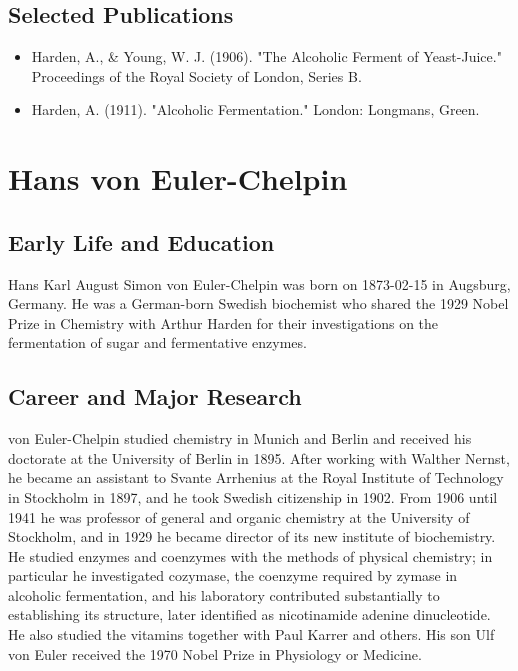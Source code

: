 \subsection*{Selected Publications}

\begin{itemize}

\item Harden, A., \& Young, W. J. (1906). "The Alcoholic Ferment of Yeast-Juice." Proceedings of the Royal Society of London, Series B.

\item Harden, A. (1911). "Alcoholic Fermentation." London: Longmans, Green.

\end{itemize}

\clearpage

\section{Hans von Euler-Chelpin}

\subsection*{Early Life and Education}

Hans Karl August Simon von Euler-Chelpin was born on 1873-02-15 in Augsburg, Germany.
He was a German-born Swedish biochemist who shared the 1929 Nobel Prize in Chemistry with Arthur Harden for their investigations on the fermentation of sugar and fermentative enzymes.

\subsection*{Career and Major Research}

von Euler-Chelpin studied chemistry in Munich and Berlin and received his doctorate at the University of Berlin in 1895.
After working with Walther Nernst, he became an assistant to Svante Arrhenius at the Royal Institute of Technology in Stockholm in 1897, and he took Swedish citizenship in 1902.
From 1906 until 1941 he was professor of general and organic chemistry at the University of Stockholm, and in 1929 he became director of its new institute of biochemistry.
He studied enzymes and coenzymes with the methods of physical chemistry; in particular he investigated cozymase, the coenzyme required by zymase in alcoholic fermentation, and his laboratory contributed substantially to establishing its structure, later identified as nicotinamide adenine dinucleotide.
He also studied the vitamins together with Paul Karrer and others.
His son Ulf von Euler received the 1970 Nobel Prize in Physiology or Medicine.

